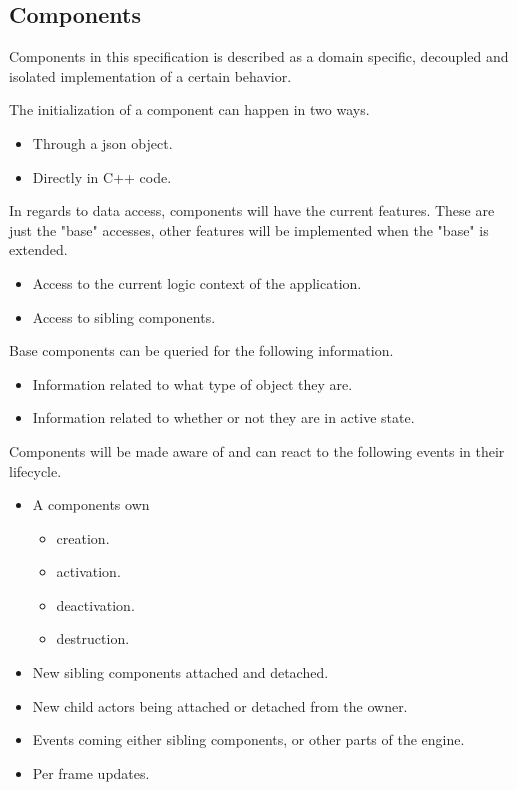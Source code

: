 \subsection{Components}
Components in this specification is described as a domain specific, decoupled and isolated
implementation of a certain behavior.

The initialization of a component can happen in two ways.
\begin{itemize}
    \item
    Through a json object.

    \item
    Directly in C++ code.
\end{itemize}

In regards to data access, components will have the current features.
These are just the "base" accesses, other features will be implemented when the "base" is extended.
\begin{itemize}
    \item
    Access to the current logic context of the application.

    \item
    Access to sibling components.
\end{itemize}

Base components can be queried for the following information.
\begin{itemize}
    \item
    Information related to what type of object they are.

    \item
    Information related to whether or not they are in active state.
\end{itemize}

Components will be made aware of and can react to the following events in their lifecycle.
\begin{itemize}
    \item 
    A components own
    \begin{itemize}
        \item creation.
        \item activation.
        \item deactivation.
        \item destruction.
    \end{itemize}

    \item
    New sibling components attached and detached.

    \item
    New child actors being attached or detached from the owner.

    \item
    Events coming either sibling components, or other parts of the engine.

    \item
    Per frame updates.
\end{itemize}

